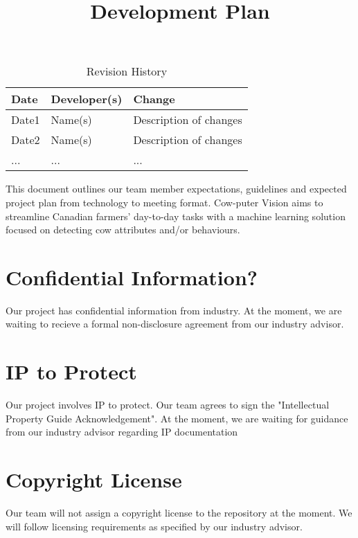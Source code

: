 \documentclass{article}
\title{Development Plan\\\progname}
\author{\authname}
\date{}
\begin{document}
\maketitle

\begin{table}[hp]
\caption{Revision History} \label{TblRevisionHistory}
\begin{tabularx}{\textwidth}{llX}
\toprule
\textbf{Date} & \textbf{Developer(s)} & \textbf{Change}\\
\midrule
Date1 & Name(s) & Description of changes\\
Date2 & Name(s) & Description of changes\\
... & ... & ...\\
\bottomrule
\end{tabularx}
\end{table}

\newpage{}

\noindent This document outlines our team member expectations, guidelines and expected project plan from technology to meeting format. Cow-puter Vision aims to streamline Canadian farmers' day-to-day tasks with a machine learning solution focused on detecting cow attributes and/or behaviours. 

\section{Confidential Information?}

Our project has confidential information from industry. At the moment, we are waiting to recieve a formal non-disclosure agreement from our industry advisor.

\section{IP to Protect}

Our project involves IP to protect. Our team agrees to sign the "Intellectual Property Guide Acknowledgement". At the moment, we are waiting for guidance from our industry advisor regarding IP documentation

\section{Copyright License}

Our team will not assign a copyright license to the repository at the moment. We will follow licensing requirements as specified by our industry advisor.
\end{document}
